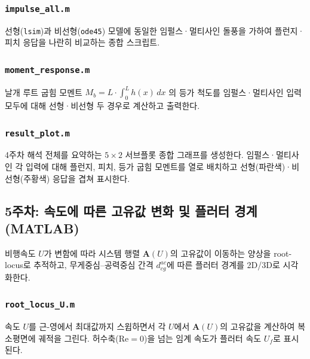 \documentclass[
	a4paper, %
	10pt, %
]{CSUniSchoolLabReport}
\begin{document}
\subsubsection{\texttt{impulse\_all.m}}
선형(\texttt{lsim})과 비선형(\texttt{ode45}) 모델에 동일한 임펄스·멀티사인 돌풍을 가하여
플런지·피치 응답을 나란히 비교하는 종합 스크립트.



\subsubsection{\texttt{moment\_response.m}}
날개 루트 굽힘 모멘트 \(M_b = L \cdot \int_0^L h(x)\,dx\) 의 등가 척도를
임펄스·멀티사인 입력 모두에 대해 선형·비선형 두 경우로 계산하고 출력한다.



\subsubsection{\texttt{result\_plot.m}}
4주차 해석 전체를 요약하는 \(5\times2\) 서브플롯 종합 그래프를 생성한다.
임펄스·멀티사인 각 입력에 대해 플런지, 피치, 등가 굽힘 모멘트를 열로 배치하고
선형(파란색)·비선형(주황색) 응답을 겹쳐 표시한다.



\subsection{5주차: 속도에 따른 고유값 변화 및 플러터 경계 (MATLAB)}
비행속도 \(U\)가 변함에 따라 시스템 행렬 \(\mathbf{A}(U)\)의 고유값이 이동하는 양상을
root-locus로 추적하고, 무게중심--공력중심 간격 \(d_{cg}^{ac}\)에 따른 플러터 경계를 2D/3D로 시각화한다.

\subsubsection{\texttt{root\_locus\_U.m}}
속도 \(U\)를 근-영에서 최대값까지 스윕하면서 각 \(U\)에서 \(\mathbf{A}(U)\)의
고유값을 계산하여 복소평면에 궤적을 그린다. 허수축(\(\mathrm{Re}=0\))을 넘는
임계 속도가 플러터 속도 \(U_f\)로 표시된다.
\end{document}
